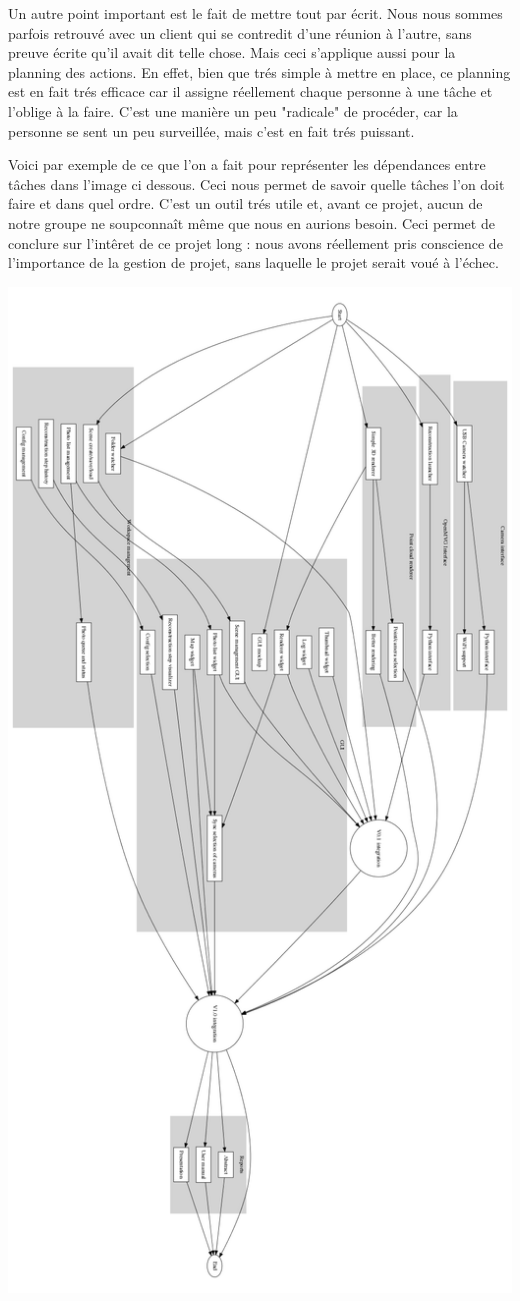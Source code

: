 	Un autre point important est le fait de mettre tout par écrit. Nous nous sommes parfois retrouvé avec un client qui se contredit d'une réunion à l'autre, sans preuve écrite qu'il avait dit telle chose. Mais ceci
s'applique aussi pour la planning des actions. En effet, bien que trés simple à mettre en place, ce planning est en fait trés efficace car il assigne réellement chaque personne à une tâche et l'oblige à la faire. C'est une
manière un peu "radicale"  de procéder, car la personne se sent un peu surveillée, mais c'est en fait trés puissant. 

    Voici par exemple de ce que l'on a fait pour représenter les dépendances entre tâches dans l'image ci dessous. Ceci nous permet de savoir quelle tâches l'on doit faire et dans quel ordre. C'est un outil trés utile et, avant ce projet, aucun de notre groupe ne soupconnaît même que nous en aurions besoin. Ceci permet de conclure sur l'intêret de  ce projet long : nous avons réellement pris conscience de l'importance de la gestion de projet, sans laquelle le projet serait voué à l'échec. 
    
    \includegraphics[scale=0.5]{task-dependencies.png}